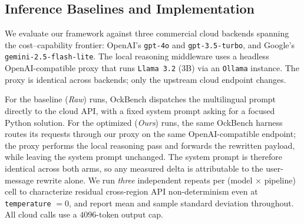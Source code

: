 \documentclass[11pt,a4paper,twocolumn]{article}
\begin{document}
\subsection{Inference Baselines and Implementation}
We evaluate our framework against three commercial cloud backends spanning the cost--capability frontier: OpenAI's \texttt{gpt-4o} and \texttt{gpt-3.5-turbo}, and Google's \texttt{gemini-2.5-flash-lite}. The local reasoning middleware uses a headless OpenAI-compatible proxy that runs \texttt{Llama 3.2} (3B) via an \texttt{Ollama} instance. The proxy is identical across backends; only the upstream cloud endpoint changes.

For the baseline (\textit{Raw}) runs, OckBench dispatches the multilingual prompt directly to the cloud API, with a fixed system prompt asking for a focused Python solution. For the optimized (\textit{Ours}) runs, the same OckBench harness routes its requests through our proxy on the same OpenAI-compatible endpoint; the proxy performs the local reasoning pass and forwards the rewritten payload, while leaving the system prompt unchanged. The system prompt is therefore identical across both arms, so any measured delta is attributable to the user-message rewrite alone. We run \textit{three} independent repeats per (model $\times$ pipeline) cell to characterize residual cross-region API non-determinism even at \texttt{temperature} $= 0$, and report mean and sample standard deviation throughout. All cloud calls use a $4096$-token output cap.
\end{document}
